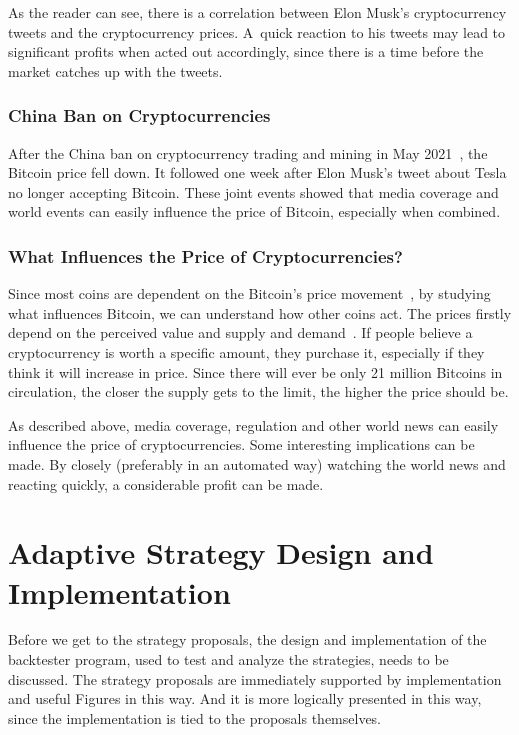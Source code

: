 As the reader can see, there is a correlation between Elon Musk's cryptocurrency tweets and the cryptocurrency prices. A~quick reaction to his tweets may lead to significant profits when acted out accordingly, since there is a time before the market catches up with the tweets.

\subsection*{China Ban on Cryptocurrencies}
After the China ban on cryptocurrency trading and mining in May 2021~\cite{china-ban-2}, the Bitcoin price fell down. It followed one week after Elon Musk's tweet about Tesla no longer accepting Bitcoin. These joint events showed that media coverage and world events can easily influence the price of Bitcoin, especially when combined.

\subsection*{What Influences the Price of Cryptocurrencies?}
Since most coins are dependent on the Bitcoin's price movement~\cite{investopedia:altcoins}, by studying what influences Bitcoin, we can understand how other coins act. The prices firstly depend on the perceived value and supply and demand~\cite{investopedia:bitcoin-price-history}. If people believe a cryptocurrency is worth a specific amount, they purchase it, especially if they think it will increase in price. Since there will ever be only 21 million Bitcoins in circulation, the closer the supply gets to the limit, the higher the price should be.

As described above, media coverage, regulation and other world news can easily influence the price of cryptocurrencies. Some interesting implications can be made. By closely (preferably in an automated way) watching the world news and reacting quickly, a considerable profit can be made.

\chapter{Adaptive Strategy Design and Implementation}
\label{chapter-implementation}

Before we get to the strategy proposals, the design and implementation of the backtester program, used to test and analyze the strategies, needs to be discussed. The strategy proposals are immediately supported by implementation and useful Figures in this way. And it is more logically presented in this way, since the implementation is tied to the proposals themselves.

